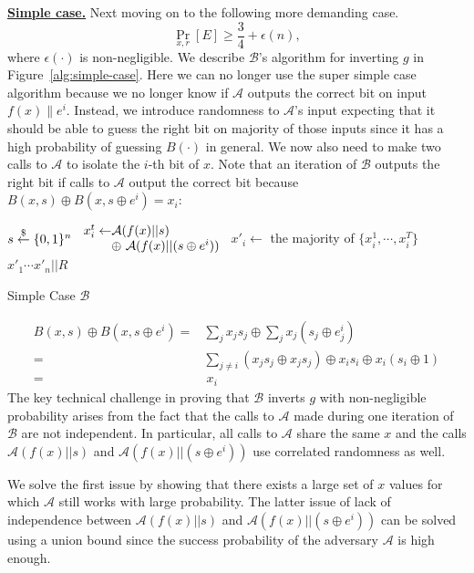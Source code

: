 \documentclass[12pt]{tufte-book}
\newcommand{\ma}{\mathcal{A}}
\begin{document}
\bigskip
\noindent\textbf{\underline{Simple case.}}
Next moving on to the following more demanding case.
$$\Pr_{x,r}[E] \geq \frac{3}{4} + \epsilon(n),$$ where $\epsilon(\cdot)$ is non-negligible.
We describe $\mathcal{B}$'s algorithm for inverting $g$ in Figure~\ref{alg:simple-case}.
Here we can no longer use the super simple case algorithm because we no longer know if $\ma$ outputs the correct bit on input $f(x) \| e^i$.
Instead, we introduce randomness to $\ma$'s input expecting that it should be able to guess the right bit on majority of those inputs since it has a high probability of guessing $B(\cdot)$ in general.
We now also need to make two calls to $\ma$ to isolate the $i$-th bit of $x$.
Note that an iteration of $\mathcal{B}$ outputs the right bit if calls to $\ma$ output the correct bit because $B(x,s) \oplus B(x, s\oplus e^i) = x_i$:
\begin{marginfigure}
\begin{algorithmic}
		\State $s \stackrel{\$}{\leftarrow} \{0,1\}^{n}$
		\State $\begin{array}{l@{}l}
		x_i^t \leftarrow& \ma(f(x)|| s) \\
		& \oplus~ \ma(f(x) || (s\oplus e^i))
		\end{array}$
	\EndFor
	\State $x'_i \gets $ the majority of $\{x_i^1, \cdots, x_i^T\}$
\EndFor
\State \Return $x'_1\cdots x'_n||R$
\end{algorithmic}
\caption{Simple Case $\mathcal{B}$} \label{alg:simple-case}
\end{marginfigure}
\begin{align*}
B(x,s) \oplus B(x, s\oplus e^i) =& \sum_j x_j s_j \oplus \sum_j x_j (s_j \oplus e^i_j)\\
=& \sum_{j \not= i} (x_j s_j \oplus x_j s_j) \oplus x_i s_i \oplus x_i (s_i \oplus 1)\\
=& ~x_i
\end{align*}
The key technical challenge in proving that $\mathcal{B}$ inverts $g$ with non-negligible probability arises from the fact that the calls to $\ma$ made during one iteration of $\mathcal{B}$ are not independent.
In particular, all calls to $\ma$ share the same $x$ and the calls $\ma(f(x)|| s)$ and $\ma(f(x) || (s \oplus e^i))$ use correlated randomness as well.

We solve the first issue by showing that there exists a large set of $x$ values for which $\ma$ still works with large probability.
The latter issue of lack of independence between $\ma(f(x)|| s)$ and $\ma(f(x) || (s \oplus e^i))$ can be solved using a union bound since the success probability of the adversary $\ma$ is high enough.
\end{document}
